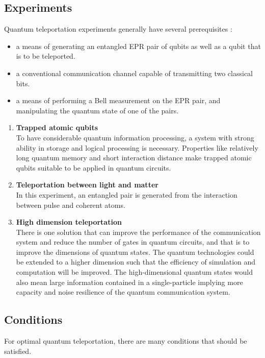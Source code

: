 \documentclass{article}
\begin{document}
\subsection{Experiments}
Quantum teleportation experiments generally have several prerequisites \cite{teleexp}: 
\begin{itemize}
    \item a means of generating an entangled EPR pair of qubits as well as a qubit that is to be teleported. 
    \item a conventional communication channel capable of transmitting two classical bits. 
    \item a means of performing a Bell measurement on the EPR pair, and manipulating the quantum state of one of the pairs. 
\end{itemize}

\begin{enumerate}
    \item \textbf{Trapped atomic qubits}\\
    To have considerable quantum information processing, a system with strong ability in storage and logical processing is necessary. Properties like relatively long quantum memory and short interaction distance make trapped atomic qubits suitable to be applied in quantum circuits.\cite{qtapplications}\\
    \item \textbf{Teleportation between light and matter}\\
    In this experiment, an entangled pair is generated from the interaction between pulse and coherent atoms.\cite{qtapplications}\\
    \item \textbf{High dimension teleportation}\\
    There is one solution that can improve the performance of the communication system and reduce the number of gates in quantum circuits, and that is to improve the dimensions of quantum states. The quantum technologies could be extended to a higher dimension such that the efficiency of simulation and computation will be improved. The high-dimensional quantum states would also mean large information contained in a single-particle implying more capacity and noise resilience of the quantum communication system.\cite{qtapplications} 
\end{enumerate}


\subsection{Conditions}
For optimal quantum teleportation, there are many conditions that should be satisfied. \cite{qtapplications}
\end{document}
